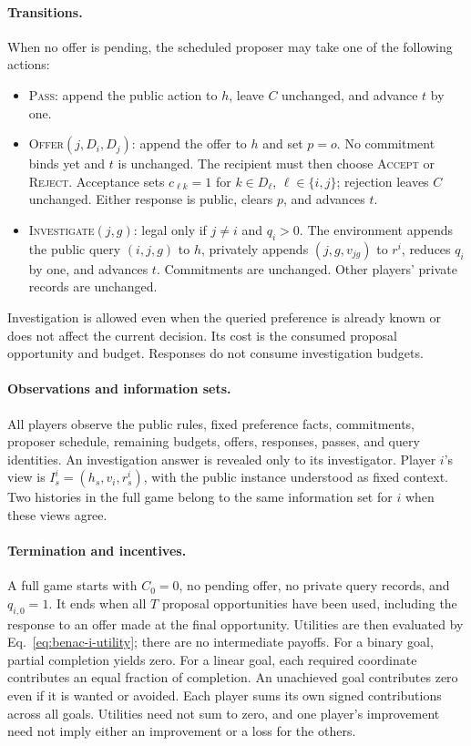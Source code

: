 \paragraph{Transitions.}
When no offer is pending, the scheduled proposer may take one of the
following actions:
\begin{itemize}
 \item \textsc{Pass}: append the public action to $h$, leave $C$ unchanged,
 and advance $t$ by one.
 \item \textsc{Offer}$(j,D_i,D_j)$: append the offer to $h$ and set $p=o$.
 No commitment binds yet and $t$ is unchanged. The recipient must then
 choose \textsc{Accept} or \textsc{Reject}. Acceptance sets
 $c_{\ell k}=1$ for $k\in D_\ell$, $\ell\in\{i,j\}$; rejection leaves
 $C$ unchanged. Either response is public, clears $p$, and advances $t$.
 \item \textsc{Investigate}$(j,g)$: legal only if $j\ne i$ and $q_i>0$.
 The environment appends the public query $(i,j,g)$ to $h$, privately
 appends $(j,g,v_{jg})$ to $r^i$, reduces $q_i$ by one, and advances $t$.
 Commitments are unchanged. Other players' private records are unchanged.
\end{itemize}
Investigation is allowed even when the queried preference is already known
or does not affect the current decision. Its cost is the consumed proposal
opportunity and budget. Responses do not consume investigation budgets.

\paragraph{Observations and information sets.}
All players observe the public rules, fixed preference facts, commitments,
proposer schedule, remaining budgets, offers, responses, passes, and query
identities. An investigation answer is revealed only to its investigator.
Player $i$'s view is $I_s^i=(h_s,v_i,r_s^i)$, with the public instance
understood as fixed context. Two histories in the full game belong to the
same information set for $i$ when these views agree.

\paragraph{Termination and incentives.}
A full game starts with $C_0=0$, no pending offer, no private query records,
and $q_{i,0}=1$. It ends when all $T$ proposal opportunities have been used,
including the response to an offer made at the final opportunity. Utilities
are then evaluated by Eq.~\ref{eq:benac-i-utility}; there are no intermediate
payoffs. For a binary goal, partial completion yields zero. For a linear
goal, each required coordinate contributes an equal fraction of completion.
An unachieved goal contributes zero even if it is wanted or avoided.
Each player sums its own signed contributions across all goals. Utilities
need not sum to zero, and one player's improvement need not imply either
an improvement or a loss for the others.

